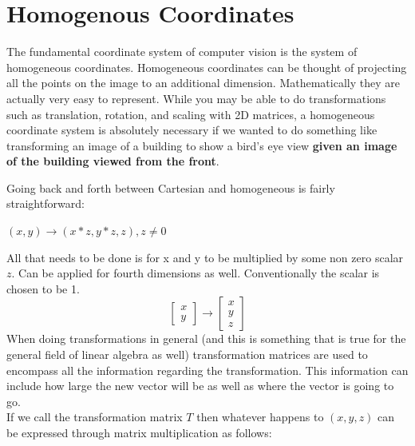 \documentclass{article}
\begin{document}
\section{Homogenous Coordinates}

The fundamental coordinate system of computer vision is the system of homogeneous coordinates. Homogeneous coordinates can be thought of projecting all the points on the image to an additional dimension. Mathematically they are actually very easy to represent. While you may be able to do transformations such as translation, rotation, and scaling with 2D matrices, a homogeneous coordinate system is absolutely necessary if we wanted to do something like transforming an image of a building to show a bird's eye view \textbf{ given an image of the building viewed from the front}. 

Going back and forth between Cartesian and homogeneous is fairly straightforward: 
\begin{center}
\begin{math}(x,y) \rightarrow (x*z,y*z,z),  z \ne 0 \end{math} \\
\end{center}
All that needs to be done is for x and y to be multiplied by some non zero scalar \begin{math}z\end{math}. Can be applied for fourth dimensions as well. Conventionally the scalar is chosen to be 1.
\[
\begin{bmatrix}
    x\\
    y
\end{bmatrix}
\rightarrow
\begin{bmatrix}
    x\\
    y\\
    z
\end{bmatrix}
\]
When doing transformations in general (and this is something that is true for the general field of linear algebra as well) transformation matrices are used to encompass all the information regarding the transformation. This information can include how large the new vector will be as well as where the vector is going to go. \\
If we call the transformation matrix \begin{math} T \end{math}
then whatever happens to \begin{math} (x,y,z) \end{math} can be expressed through matrix multiplication as follows: \\
\end{document}
